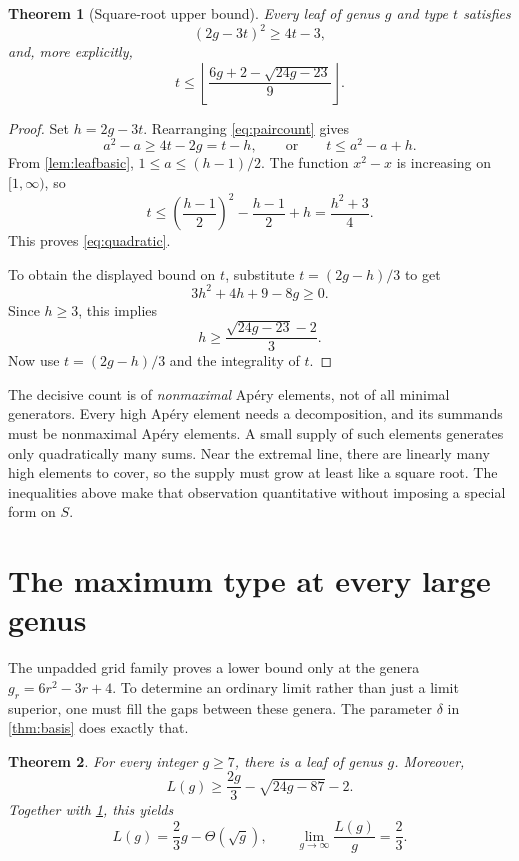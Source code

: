 \documentclass[11pt,letterpaper]{article}
\numberwithin{equation}{section}
\newtheorem{theorem}{Theorem}[section]
\theoremstyle{definition}
\theoremstyle{remark}
\begin{document}
\begin{theorem}[Square-root upper bound]\label{thm:upper}
Every leaf of genus $g$ and type $t$ satisfies
\begin{equation}\label{eq:quadratic}
 (2g-3t)^2\ge4t-3,
\end{equation}
and, more explicitly,
\begin{equation}\label{eq:upperexplicit}
 t\le\left\lfloor\frac{6g+2-\sqrt{24g-23}}9\right\rfloor.
\end{equation}
\end{theorem}

\begin{proof}
Set $h=2g-3t$. Rearranging \eqref{eq:paircount} gives
\[
 a^2-a\ge4t-2g=t-h,
 \qquad\text{or}\qquad t\le a^2-a+h.
\]
From \cref{lem:leafbasic}, $1\le a\le(h-1)/2$. The function $x^2-x$ is
increasing on $[1,\infty)$, so
\[
 t\le\left(\frac{h-1}{2}\right)^2-\frac{h-1}{2}+h
   =\frac{h^2+3}{4}.
\]
This proves \eqref{eq:quadratic}.

To obtain the displayed bound on $t$, substitute $t=(2g-h)/3$ to get
\[
 3h^2+4h+9-8g\ge0.
\]
Since $h\ge3$, this implies
\[
 h\ge\frac{\sqrt{24g-23}-2}{3}.
\]
Now use $t=(2g-h)/3$ and the integrality of $t$.
\end{proof}

The decisive count is of \emph{nonmaximal} Ap\'ery elements, not of all
minimal generators. Every high Ap\'ery element needs a decomposition, and
its summands must be nonmaximal Ap\'ery elements. A small supply of such
elements generates only quadratically many sums. Near the extremal line,
there are linearly many high elements to cover, so the supply must grow at
least like a square root. The inequalities above make that observation
quantitative without imposing a special form on $S$.

\section{The maximum type at every large genus}\label{sec:asymptotic}

The unpadded grid family proves a lower bound only at the genera
$g_r=6r^2-3r+4$. To determine an ordinary limit rather than just a limit
superior, one must fill the gaps between these genera. The parameter
$\delta$ in \cref{thm:basis} does exactly that.

\begin{theorem}\label{thm:allg}
For every integer $g\ge7$, there is a leaf of genus $g$. Moreover,
\begin{equation}\label{eq:lowerexplicit}
 L(g)\ge\frac{2g}{3}-\sqrt{24g-87}-2.
\end{equation}
Together with \cref{thm:upper}, this yields
\begin{equation}\label{eq:theta}
 L(g)=\frac23g-\Theta(\sqrt g),\qquad
 \lim_{g\to\infty}\frac{L(g)}g=\frac23.
\end{equation}
\end{theorem}
\end{document}
